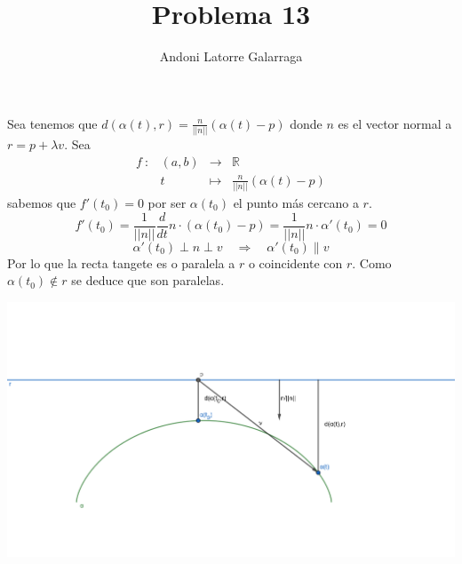 \documentclass{article}
\title{Problema 13}
\author{Andoni Latorre Galarraga}
\date{}
\begin{document}
\setlength{\parindent}{0cm}
\maketitle

Sea tenemos que $d(\alpha(t),r)=\frac{n}{||n||}(\alpha(t)-p)$ donde $n$ es el vector normal a $r=p+\lambda v$. Sea 
$$
\begin{array}{cccc}
    f\::&(a,b)&\longrightarrow&\mathbb{R}\\
        &t&\longmapsto&\frac{n}{||n||}(\alpha(t)-p)
\end{array}
$$
sabemos que $f'(t_0) = 0$ por ser $\alpha(t_0)$ el punto más cercano a $r$.
$$
f'(t_0)=\frac{1}{||n||}\frac{d}{dt}n\cdot(\alpha(t_0)-p)=\frac{1}{||n||}n\cdot\alpha'(t_0)=0
$$
$$
\alpha'(t_0) \perp n \perp v \quad \Rightarrow \quad \alpha'(t_0)\parallel v
$$
Por lo que la recta tangete es o paralela a $r$ o coincidente con $r$. Como $\alpha(t_0)\notin r$ se deduce que son paralelas.
\begin{center}
    \includegraphics[]{figuras/geogebra-export.png}\\
\end{center}
\end{document}
